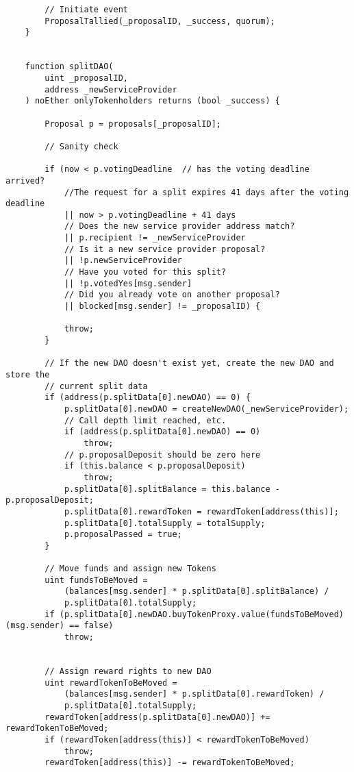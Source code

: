 \documentclass[9pt,oneside]{amsart}
\begin{document}
\begin{appendix}
\begin{verbatim}
        // Initiate event
        ProposalTallied(_proposalID, _success, quorum);
    }


    function splitDAO(
        uint _proposalID,
        address _newServiceProvider
    ) noEther onlyTokenholders returns (bool _success) {

        Proposal p = proposals[_proposalID];

        // Sanity check

        if (now < p.votingDeadline  // has the voting deadline arrived?
            //The request for a split expires 41 days after the voting deadline
            || now > p.votingDeadline + 41 days
            // Does the new service provider address match?
            || p.recipient != _newServiceProvider
            // Is it a new service provider proposal?
            || !p.newServiceProvider
            // Have you voted for this split?
            || !p.votedYes[msg.sender]
            // Did you already vote on another proposal?
            || blocked[msg.sender] != _proposalID) {

            throw;
        }

        // If the new DAO doesn't exist yet, create the new DAO and store the
        // current split data
        if (address(p.splitData[0].newDAO) == 0) {
            p.splitData[0].newDAO = createNewDAO(_newServiceProvider);
            // Call depth limit reached, etc.
            if (address(p.splitData[0].newDAO) == 0)
                throw;
            // p.proposalDeposit should be zero here
            if (this.balance < p.proposalDeposit)
                throw;
            p.splitData[0].splitBalance = this.balance - p.proposalDeposit;
            p.splitData[0].rewardToken = rewardToken[address(this)];
            p.splitData[0].totalSupply = totalSupply;
            p.proposalPassed = true;
        }

        // Move funds and assign new Tokens
        uint fundsToBeMoved =
            (balances[msg.sender] * p.splitData[0].splitBalance) /
            p.splitData[0].totalSupply;
        if (p.splitData[0].newDAO.buyTokenProxy.value(fundsToBeMoved)(msg.sender) == false)
            throw;


        // Assign reward rights to new DAO
        uint rewardTokenToBeMoved =
            (balances[msg.sender] * p.splitData[0].rewardToken) /
            p.splitData[0].totalSupply;
        rewardToken[address(p.splitData[0].newDAO)] += rewardTokenToBeMoved;
        if (rewardToken[address(this)] < rewardTokenToBeMoved)
            throw;
        rewardToken[address(this)] -= rewardTokenToBeMoved;


\end{verbatim}
\end{appendix}
\end{document}
